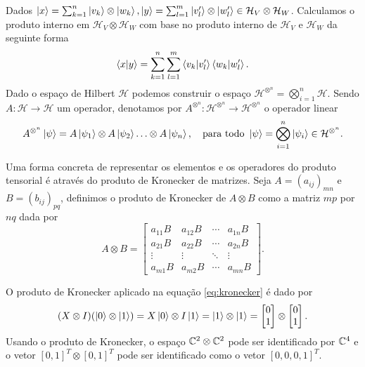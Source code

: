 Dados $\ket{x} = \sum_{k=1}^n \ket{v_k}\otimes \ket{w_k}, \ket{y}=\sum_{l=1}^m\ket{v'_l}\otimes\ket{w'_l}\in \mathcal{H}_V \otimes \mathcal{H}_W$. Calculamos o produto interno em $\mathcal{H}_V \otimes \mathcal{H}_W$ com base no produto interno de $\mathcal{H}_V$ e $\mathcal{H}_W$ da seguinte forma
\begin{equation}
	\braket{x|y} = \sum_{k=1}^n\sum_{l=1}^{m}\braket{v_k|v_l'}\braket{w_k|w'_l}.
\end{equation}
Dado o espaço de Hilbert $\mathcal{H}$ podemos construir o espaço $\mathcal{H}^{\otimes^n} = \bigotimes_{i=1}^n\mathcal{H}$. Sendo $A: \mathcal{H}\to \mathcal{H}$ um operador, denotamos por $A^{\otimes^n}: \mathcal{H}^{\otimes^n}\to \mathcal{H}^{\otimes^n}$ o operador linear
\begin{equation}
	A^{\otimes^n}\ket{\psi} = A\ket{\psi_1}\otimes A\ket{\psi_2}\dotso \otimes A\ket{\psi_n}, \quad \text{para todo } \ket{\psi} = \bigotimes_{i=1}^n\ket{\psi_i} \in \mathcal{H}^{\otimes^n}.
\end{equation}

Uma forma concreta de representar os elementos e os operadores do produto tensorial é através do produto de Kronecker de matrizes. Seja $A=(a_{ij})_{mn}$ e $B=(b_{ij})_{pq}$, definimos o produto de Kronecker de $A\otimes B$ como a matriz $mp$ por $nq$ dada por
$$
A \otimes B = 
\begin{bmatrix}
	a_{11} B & a_{12} B & \cdots & a_{1n} B 	\\
	a_{21} B & a_{22} B & \cdots & a_{2n} B 	\\
	\vdots   & \vdots   & \ddots & \vdots     	\\
	a_{m1} B & a_{m2} B & \cdots & a_{mn} B
\end{bmatrix}.
$$

\begin{example}
	O produto de Kronecker aplicado na equação \eqref{eq:kronecker} é dado por
	\begin{equation}
		(X \otimes I)(\ket{0}\otimes\ket{1})
		=
		X\ket{0} \otimes I\ket{1}
		=
		\ket{1}\otimes\ket{1} = \begin{bmatrix}
			0 \\
			1
		\end{bmatrix} \otimes \begin{bmatrix}
			0 \\
			1
		\end{bmatrix}.
	\end{equation}
Usando o produto de Kronecker, o espaço $\mathbb{C}^2\otimes\mathbb{C}^2$ pode ser identificado por $\mathbb{C}^4$ e o vetor $[0, 1]^T\otimes [0, 1]^T$ pode ser identificado como o vetor $[0, 0, 0, 1]^T$.
\end{example}